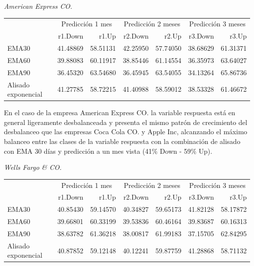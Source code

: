 \documentclass[]{DissertateUSU}
\begin{document}
\emph{American Express CO.} \setlength\parskip{5ex}

\begin{table}[H]
\centering\begingroup\fontsize{10}{12}\selectfont

\begin{tabular}{l|r|r|r|r|r|r}
\hline
\multicolumn{1}{c|}{ } & \multicolumn{2}{c|}{Predicción 1 mes} & \multicolumn{2}{c|}{Predicción 2 meses} & \multicolumn{2}{c}{Predicción 3 meses} \\
\cline{2-3} \cline{4-5} \cline{6-7}
  & r1.Down & r1.Up & r2.Down & r2.Up & r3.Down & r3.Up\\
\hline
EMA30 & 41.48869 & 58.51131 & 42.25950 & 57.74050 & 38.68629 & 61.31371\\
\hline
EMA60 & 39.88083 & 60.11917 & 38.85446 & 61.14554 & 36.35973 & 63.64027\\
\hline
EMA90 & 36.45320 & 63.54680 & 36.45945 & 63.54055 & 34.13264 & 65.86736\\
\hline
Alisado exponencial & 41.27785 & 58.72215 & 41.40988 & 58.59012 & 38.53328 & 61.46672\\
\hline
\end{tabular}
\endgroup{}
\end{table}

\setlength\parskip{5ex}

\noindent En el caso de la empresa American Express CO. la variable
respuesta está en general ligeramente desbalanceada y presenta el mismo
patrón de crecimiento del desbalanceo que las empresas Coca Cola CO. y
Apple Inc, alcanzando el máximo balanceo entre las clases de la variable
respuesta con la combinación de alisado con EMA 30 días y predicción a
un mes vista (41\% Down - 59\% Up).

\emph{Wells Fargo \& CO.} \setlength\parskip{5ex}

\begin{table}[H]
\centering\begingroup\fontsize{10}{12}\selectfont

\begin{tabular}{l|r|r|r|r|r|r}
\hline
\multicolumn{1}{c|}{ } & \multicolumn{2}{c|}{Predicción 1 mes} & \multicolumn{2}{c|}{Predicción 2 meses} & \multicolumn{2}{c}{Predicción 3 meses} \\
\cline{2-3} \cline{4-5} \cline{6-7}
  & r1.Down & r1.Up & r2.Down & r2.Up & r3.Down & r3.Up\\
\hline
EMA30 & 40.85430 & 59.14570 & 40.34827 & 59.65173 & 41.82128 & 58.17872\\
\hline
EMA60 & 39.66801 & 60.33199 & 39.53836 & 60.46164 & 39.83687 & 60.16313\\
\hline
EMA90 & 38.63782 & 61.36218 & 38.00817 & 61.99183 & 37.15705 & 62.84295\\
\hline
Alisado exponencial & 40.87852 & 59.12148 & 40.12241 & 59.87759 & 41.28868 & 58.71132\\
\hline
\end{tabular}
\endgroup{}
\end{table}
\end{document}
